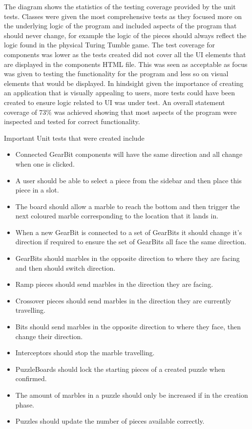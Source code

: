 \documentclass{l4proj}
\begin{document}
The diagram shows the statistics of the testing coverage provided by the unit tests. Classes were given the most comprehensive tests as they focused more on the underlying logic of the program and included aspects of the program that should never change, for example the logic of the pieces should always reflect the logic found in the physical Turing Tumble game. The test coverage for components was lower as the tests created did not cover all the UI elements that are displayed in the components HTML file. This was seen as acceptable as focus was given to testing the functionality for the program and less so on visual elements that would be displayed. In hindsight given the importance of creating an application that is visually appealing to users, more tests could have been created to ensure logic related to UI was under test. An overall statement coverage of 73\% was achieved showing that most aspects of the program were inspected and tested for correct functionality.

Important Unit tests that were created include
\begin{itemize}
    \item Connected GearBit components will have the same direction and all change when one is clicked.
    \item A user should be able to select a piece from the sidebar and then place this piece in a slot.
    \item The board should allow a marble to reach the bottom and then trigger the next coloured marble corresponding to the location that it lands in.
    \item When a new GearBit is connected to a set of GearBits it should change it's direction if required to ensure the set of GearBits all face the same direction.
    \item GearBits should marbles in the opposite direction to where they are facing and then should switch direction.
    \item Ramp pieces should send marbles in the direction they are facing.
    \item Crossover pieces should send marbles in the direction they are currently travelling.
    \item Bits should send marbles in the opposite direction to where they face, then change their direction.
    \item Interceptors should stop the marble travelling.
    \item PuzzleBoards should lock the starting pieces of a created puzzle when confirmed.
    \item The amount of marbles in a puzzle should only be increased if in the creation phase.
    \item Puzzles should update the number of pieces available correctly.
\end{itemize}
\end{document}
